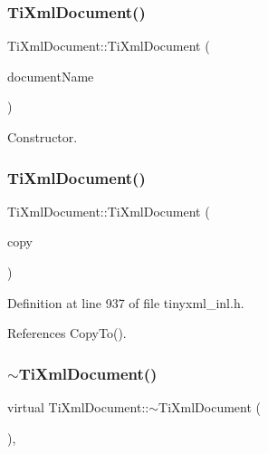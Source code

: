 \hypertarget{class_ti_xml_document_a2c6e58fb99bfa76cc613f16840022225}{}\label{class_ti_xml_document_a2c6e58fb99bfa76cc613f16840022225} 
\subsubsection{\texorpdfstring{Ti\+Xml\+Document()}{TiXmlDocument()}\hspace{0.1cm}{\footnotesize\ttfamily [3/4]}}
{\footnotesize\ttfamily Ti\+Xml\+Document\+::\+Ti\+Xml\+Document (\begin{DoxyParamCaption}\item[{const std\+::string \&}]{document\+Name }\end{DoxyParamCaption})}



Constructor. 

\hypertarget{class_ti_xml_document_a323a7486e7da6099cdc19a5ff7e74b07}{}\label{class_ti_xml_document_a323a7486e7da6099cdc19a5ff7e74b07} 
\subsubsection{\texorpdfstring{Ti\+Xml\+Document()}{TiXmlDocument()}\hspace{0.1cm}{\footnotesize\ttfamily [4/4]}}
{\footnotesize\ttfamily Ti\+Xml\+Document\+::\+Ti\+Xml\+Document (\begin{DoxyParamCaption}\item[{const \hyperlink{class_ti_xml_document}{Ti\+Xml\+Document} \&}]{copy }\end{DoxyParamCaption})}



Definition at line 937 of file tinyxml\+\_\+inl.\+h.



References Copy\+To().

\hypertarget{class_ti_xml_document_a1b8a035c2c2aab38e4387246a0b712c5}{}\label{class_ti_xml_document_a1b8a035c2c2aab38e4387246a0b712c5} 
\subsubsection{\texorpdfstring{$\sim$\+Ti\+Xml\+Document()}{~TiXmlDocument()}}
{\footnotesize\ttfamily virtual Ti\+Xml\+Document\+::$\sim$\+Ti\+Xml\+Document (\begin{DoxyParamCaption}{ }\end{DoxyParamCaption})\hspace{0.3cm}{\ttfamily [inline]}, {\ttfamily [virtual]}}



